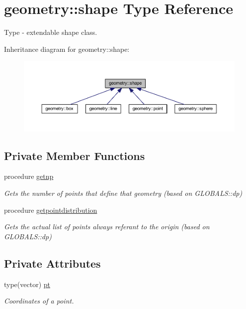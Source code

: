 \hypertarget{structgeometry_1_1shape}{}\section{geometry\+:\+:shape Type Reference}
\label{structgeometry_1_1shape}


Type -\/ extendable shape class.  




Inheritance diagram for geometry\+:\+:shape\+:\nopagebreak
\begin{figure}[H]
\begin{center}
\leavevmode
\includegraphics[width=350pt]{structgeometry_1_1shape__inherit__graph}
\end{center}
\end{figure}
\subsection*{Private Member Functions}
\begin{DoxyCompactItemize}
\item 
procedure \hyperlink{structgeometry_1_1shape_ad661871b6433bc48b165c400524dde90}{getnp}
\begin{DoxyCompactList}\small\item\em Gets the number of points that define that geometry (based on G\+L\+O\+B\+A\+L\+S\+::dp) \end{DoxyCompactList}\item 
procedure \hyperlink{structgeometry_1_1shape_a9df712486b716b472955c14057eab7ff}{getpointdistribution}
\begin{DoxyCompactList}\small\item\em Gets the actual list of points always referant to the origin (based on G\+L\+O\+B\+A\+L\+S\+::dp) \end{DoxyCompactList}\end{DoxyCompactItemize}
\subsection*{Private Attributes}
\begin{DoxyCompactItemize}
\item 
type(vector) \hyperlink{structgeometry_1_1shape_aada595aa3503cf22350737caf2931e6a}{pt}
\begin{DoxyCompactList}\small\item\em Coordinates of a point. \end{DoxyCompactList}\end{DoxyCompactItemize}


